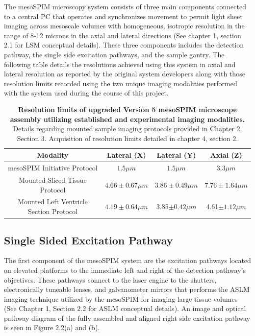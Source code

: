 The mesoSPIM microscopy system consists of three main components connected to a central PC that operates and synchronizes movement to permit light sheet imaging across mesoscale volumes with homogeneous, isotropic resolution in the range of 8-12 microns in the axial and lateral directions (See chapter 1, section 2.1 for LSM conceptual details). These three components includes the detection pathway, the single side excitation pathways, and the sample gantry. The following table details the resolutions achieved using this system in axial and lateral resolution as reported by the original system developers along with those resolution limits recorded  using the two unique imaging modalities performed with the system used during the course of this project.


\begin{table}[H]
            \begin{tabular}{|c|c|c|c|}
        \medskip
         \textbf{Modality} &\textbf{ Lateral (X)} & \textbf{Lateral (Y)} & \textbf{Axial (Z)}\\\hline
         
         mesoSPIM Initiative Protocol \cite{voigt_mesospim_2019} & $1.5 \mu m $ &$1.5 \mu m$  & $3.3 \mu m$ \\
         
         Mounted Sliced Tissue Protocol & $4.66\pm0.67\mu m$ & $3.86\pm0.49\mu m$ & $7.76\pm1.64\mu m$\\
        
         Mounted Left Ventricle Section Protocol & $4.19\pm0.64\mu m $& 3.85$\pm0.42\mu m$ & 4.61$\pm1.12\mu m$\\\hline
         
    \end{tabular}
    \medskip
    \caption{\textbf{Resolution limits of upgraded Version 5 mesoSPIM microscope assembly utilizing established and experimental imaging modalities.} Details regarding mounted sample imaging protocols provided in Chapter 2, Section 3. Acquisition of resolution limits detailed in chapter 4, section 2.}
\end{table}

 


\subsection{Single Sided Excitation Pathway}
The first component of the mesoSPIM system are the excitation pathways located on elevated platforms to the immediate left and right of the detection pathway’s objectives. These pathways connect to the laser engine to the shutters, electronically tuneable lenses, and galvanometer mirrors that performs the ASLM imaging technique utilized by the mesoSPIM for imaging large tissue volumes (See Chapter 1, Section 2.2 for ASLM conceptual details). An image and optical pathway diagram of the fully assembled and aligned right side excitation pathway is seen in Figure 2.2(a) and (b).

